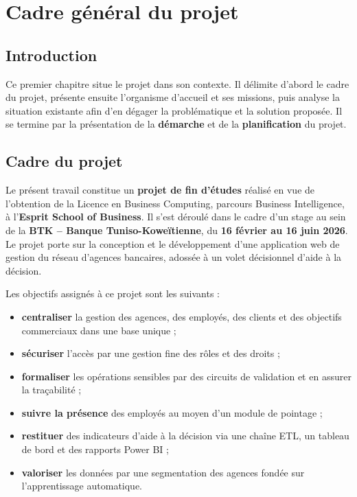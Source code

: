 \chapter{Cadre général du projet}

\section*{Introduction}
Ce premier chapitre situe le projet dans son contexte. Il délimite d'abord le
cadre du projet, présente ensuite l'organisme d'accueil et ses missions, puis
analyse la situation existante afin d'en dégager la problématique et la solution
proposée. Il se termine par la présentation de la \textbf{démarche} et de la
\textbf{planification} du projet.

\section{Cadre du projet}
Le présent travail constitue un \textbf{projet de fin d'études} réalisé en vue de
l'obtention de la Licence en Business Computing, parcours Business Intelligence, à
l'\textbf{Esprit School of Business}. Il s'est déroulé dans le cadre d'un stage au
sein de la \textbf{BTK -- Banque Tuniso-Koweïtienne}, du \textbf{16 février au
16 juin 2026}. Le projet porte sur la conception et le développement d'une
application web de gestion du réseau d'agences bancaires, adossée à un volet
décisionnel d'aide à la décision.

Les objectifs assignés à ce projet sont les suivants :
\begin{itemize}[noitemsep]
  \item \textbf{centraliser} la gestion des agences, des employés, des clients et
        des objectifs commerciaux dans une base unique ;
  \item \textbf{sécuriser} l'accès par une gestion fine des rôles et des droits ;
  \item \textbf{formaliser} les opérations sensibles par des circuits de validation
        et en assurer la traçabilité ;
  \item \textbf{suivre la présence} des employés au moyen d'un module de pointage ;
  \item \textbf{restituer} des indicateurs d'aide à la décision via une chaîne ETL,
        un tableau de bord et des rapports Power BI ;
  \item \textbf{valoriser} les données par une segmentation des agences fondée sur
        l'apprentissage automatique.
\end{itemize}

